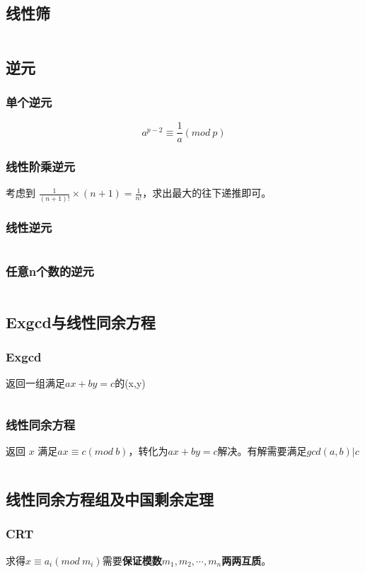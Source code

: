 \documentclass[a4paper,11pt]{article}
\begin{document}
\subsection{线性筛}
\inputminted[linenos]{c++}{math/linear.cpp}
\subsection{逆元}
\subsubsection{单个逆元}
\[a^{p-2}\equiv \frac{1}{a}(mod\ p)\]
\subsubsection{线性阶乘逆元}
考虑到
\(\frac{1}{(n+1)!}\times (n+1)=\frac{1}{n!}\)，求出最大的往下递推即可。
\subsubsection{线性逆元}
\inputminted[linenos]{c++}{math/niyuan1.cpp}
\subsubsection{任意n个数的逆元}
\inputminted[linenos]{c++}{math/niyuan2.cpp}
\subsection{Exgcd与线性同余方程}
\subsubsection{Exgcd}
返回一组满足\(ax+by=c\)的(x,y)
\inputminted[linenos]{c++}{math/exgcd.cpp}
\subsubsection{线性同余方程}
返回 \(x\)
满足\(ax\equiv c(mod\ b)\)，转化为\(ax+by=c\)解决。有解需要满足\(gcd(a,b)|c\)
\inputminted[linenos]{c++}{math/tongyufangcheng.cpp}
\subsection{线性同余方程组及中国剩余定理}
\subsubsection{CRT}
求得\(x \equiv a_i(mod\ m_i)\)需要\textbf{保证模数\(m_1,m_2,\cdots ,m_n\)两两互质}。
\inputminted[linenos]{c++}{math/crt.cpp}
\end{document}
